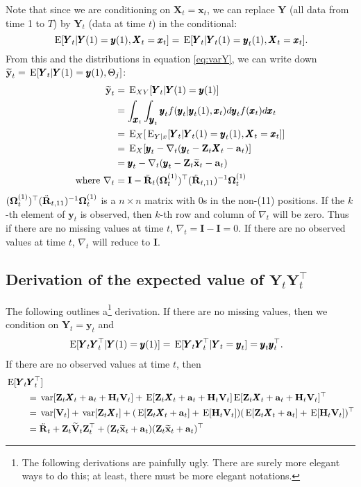 \documentclass[]{article}
\def\OMG{\mbox{\boldmath $\Omega$}}
\def\XI{\mbox{\boldmath $\Xi$}}
\def\E{\,\textup{\textrm{E}}}
\def\HH{\mbox{$\mathbf H$}}	\def\hh{\mbox{$\mathbf h$}}
\def\II{\mbox{$\mathbf I$}} \def\ii{\mbox{$\mathbf i$}}
\def\RR{\mbox{$\mathbf R$}}	 \def\rr{\mbox{$\mathbf r$}} \def\Rb{\mbox{$\mathbf H$}}	\def\Rm{\mathbb{R}}
\def\VV{\mbox{$\mathbf V$}}	\def\vv{\mbox{$\mathbf v$}}
\def\XX{\mbox{$\pmb{X}$}}	\def\xx{\mbox{$\pmb{x}$}}
\def\YY{\mbox{$\pmb{Y}$}}	\def\yy{\mbox{$\pmb{y}$}}
\def\ZZ{\mbox{$\mathbf Z$}}	\def\zz{\mbox{$\mathbf z$}}	\def\Zb{\mbox{$\mathbf M$}} \def\Za{\mbox{$\mathbf N$}} \def\Zm{\XI}
\def\var{\,\textup{\textrm{var}}}
\def\hatxt{\widetilde{\mbox{$\mathbf x$}}_t}
\def\hatyt{\widetilde{\mbox{$\mathbf y$}}_t}
\def\hatVt{\widetilde{\VV}_t}
\def\IR{\nabla}
\begin{document}
Note that since we are conditioning on $\XX_t=\xx_t$, we can replace $\YY$ (all data from time 1 to $T$) by $\YY_t$ (data at time $t$) in the conditional:
$$\E[\YY_t|\YY(1)=\yy(1),\XX_t=\xx_t]=\E[\YY_t|\YY_t(1)=\yy_t(1),\XX_t=\xx_t].$$
From this and the distributions in equation \ref{eq:varY}, we can write down $\hatyt=\E[\YY_t|\YY(1)=\yy(1),\Theta_j]$:
\begin{equation}
\begin{split}
\hatyt&=\E_{XY}[\YY_t|\YY(1)=\yy(1)]\\
&=\int_{\xx_t}\int_{\yy_t}\yy_t f(\yy_t|\yy_t(1),\xx_t)d\yy_t f(\xx_t)d\xx_t \\
&=\E_X[\E_{Y|x}[\YY_t|\YY_t(1)=\yy_t(1),\XX_t=\xx_t]]\\
&=\E_X[\yy_t-\IR_t(\yy_t-\ZZ_t\XX_t-\aa_t)]\\
&=\yy_t-\IR_t(\yy_t-\ZZ_t\hatxt-\aa_t)\\
\text{where }\IR_t &= \II-\ddot{\RR}_t(\OMG_t^{(1)})^\top(\ddot{\RR}_{t,11})^{-1}\OMG_t^{(1)}
\end{split}
\end{equation}
$(\OMG_t^{(1)})^\top(\ddot{\RR}_{t,11})^{-1}\OMG_t^{(1)}$ is a $n \times n$ matrix with 0s in the non-(11) positions. If the $k$-th element of $\yy_t$ is observed, then $k$-th row and column of $\IR_t$ will be zero.
Thus if there are no missing values at time $t$, $\IR_t=\II-\II=0$. If there are no observed values at time $t$, $\IR_t$ will reduce to $\II$. 

\subsection{Derivation of the expected value of $\YY_t\YY_t^\top$}
The following outlines a\footnote{The following derivations are painfully ugly.  There are surely more elegant ways to do this; at least, there must be more elegant notations.} derivation.  If there are no missing values, then we condition on $\YY_t=\yy_t$ and
\begin{equation}
\begin{split}
\E[\YY_t &\YY_t^\top|\YY(1)=\yy(1)] = \E[\YY_t \YY_t^\top|\YY_t=\yy_t] = \yy_t\yy_t^\top.
\end{split}
\end{equation}
If there are no observed values at time $t$, then 
\begin{equation}
\begin{split}
\E[\YY_t &\YY_t^\top]\\ 
&=\var[\ZZ_t\XX_t+\aa_t+\HH_t\VV_t]+\E[\ZZ_t\XX_t+\aa_t+\HH_t\VV_t]\E[\ZZ_t\XX_t+\aa_t+\HH_t\VV_t]^\top\\
&=\var[\VV_t]+\var[\ZZ_t\XX_t]+(\E[\ZZ_t\XX_t+\aa_t]+\E[\HH_t\VV_t])(\E[\ZZ_t\XX_t+\aa_t]+\E[\HH_t\VV_t])^\top\\
&=\ddot{\RR}_t+\ZZ_t\hatVt\ZZ_t^\top + (\ZZ_t\hatxt+\aa_t)(\ZZ_t\hatxt+\aa_t)^\top
\end{split}
\end{equation}
\end{document}
